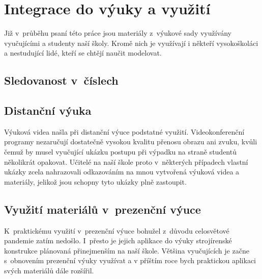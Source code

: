 \chapter{Integrace do výuky a využití}
Již v~průběhu psaní této práce jsou materiály z~výukové sady využívány vyučujícími a studenty naší školy.
Kromě nich je využívají i někteří vysokoškoláci a nestudující lidé, kteří se chtějí naučit modelovat.

\section{Sledovanost v~číslech}
\B{\textcolor{mygreen}{PŠ: Tuto sekci bych rád vztáhnul ke konkrétnímu datu a zmínil konkrétní čísla. Rád bych počkal ještě nějakou chvíli, mezitím by se sledovanost měla přehoupnout přes ty dva tisíce. TZN napíšu nejpozději ve středu večer... }\normalsize}

\section{Distanční výuka}
Výuková videa našla při distanční výuce podstatné využití.
Videokonferenční programy nezaručují dostatečně vysokou kvalitu přenosu obrazu ani zvuku, kvůli čemuž by musel vyučující ukázku postupu při výpadku na straně studentů několikrát opakovat.
Učitelé na naší škole proto v~některých případech vlastní ukázky zcela nahrazovali odkazováním na mnou vytvořená výuková videa a materiály, jelikož jsou schopny tyto ukázky plně zastoupit.
\B{\textcolor{red}{PŠ: DOPSAT PÁR VĚT.}}

\section{Využití materiálů v~prezenční výuce}
K~praktickému využití v~prezenční výuce bohužel z~důvodu celosvětové pandemie zatím nedošlo. 
I~přesto je jejich aplikace do výuky strojírenské konstrukce plánovaná přinejmenším na naší škole.
Většina vyučujících je začne s~obnovením prezenční výuky využívat a v příštím roce bych praktickou aplikaci svých materiálů dále rozšířil.

\B{\textcolor{red}{Je důležité říci, že materiály jsou volně dostupné, a proto je může při výuce již nyní využít mnoho učitelů. Ještě něcoc o tom, jak je to cool a jak snadno je to začlenitelné :-)}} 
